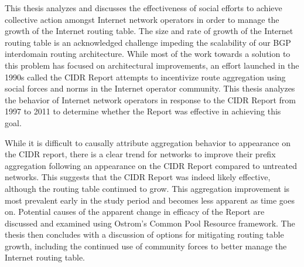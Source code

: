 %
%
%
This thesis analyzes and discusses the effectiveness of social efforts to
achieve collective action amongst Internet network operators in order to manage
the growth of the Internet routing table. The size and rate of growth of the
Internet routing table is an acknowledged challenge impeding the scalability of
our BGP interdomain routing architecture. While most of the work towards a
solution to this problem has focused on architectural improvements, an effort
launched in the 1990s called the CIDR Report attempts to incentivize route
aggregation using social forces and norms in the Internet operator community.
This thesis analyzes the behavior of Internet network operators in response to
the CIDR Report from 1997 to 2011 to determine whether the Report was
effective in achieving this goal.

While it is difficult to causally attribute aggregation behavior to appearance
on the CIDR report, there is a clear trend for networks to improve their prefix
aggregation following an appearance on the CIDR Report compared to untreated
networks. This suggests that the CIDR Report was indeed likely effective,
although the routing table continued to grow. This aggregation improvement is
most prevalent early in the study period and becomes less apparent as time goes
on. Potential causes of the apparent change in efficacy of the Report are
discussed and examined using Ostrom's Common Pool Resource framework. The
thesis then concludes with a discussion of options for mitigating routing table
growth, including the continued use of community forces to better manage the
Internet routing table.

